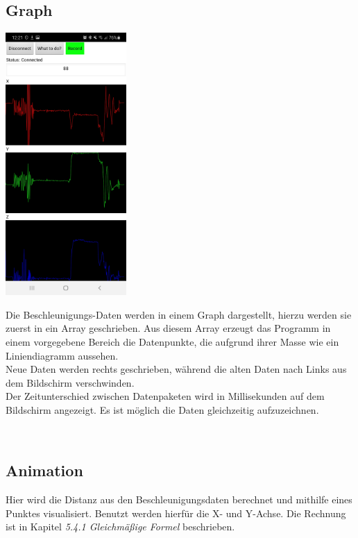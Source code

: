 \subsection{Graph}
   \begin{minipage}{0.5\textwidth}
        \includegraphics[height=10cm]{Bilder/Graph.jpg}
    \end{minipage}
    \hfill
    \begin{minipage}{0.5\textwidth}
        Die Beschleunigungs-Daten werden in einem Graph dargestellt, hierzu werden sie zuerst in ein
        Array geschrieben. Aus diesem Array erzeugt das Programm in einem vorgegebene Bereich
        die Datenpunkte, die aufgrund ihrer Masse wie ein Liniendiagramm aussehen.\\
        Neue Daten werden rechts geschrieben, während die alten Daten nach Links aus dem
        Bildschirm verschwinden.\\
        Der Zeitunterschied zwischen Datenpaketen wird in Millisekunden auf dem Bildschirm
        angezeigt.
        Es ist möglich die Daten gleichzeitig aufzuzeichnen.\\
    \end{minipage}
\\

\subsection{Animation}
Hier wird die Distanz aus den Beschleunigungsdaten berechnet und mithilfe eines Punktes
visualisiert. Benutzt werden hierfür die X- und Y-Achse. 
Die Rechnung ist in Kapitel \textit{5.4.1 Gleichmäßige Formel}  beschrieben.

